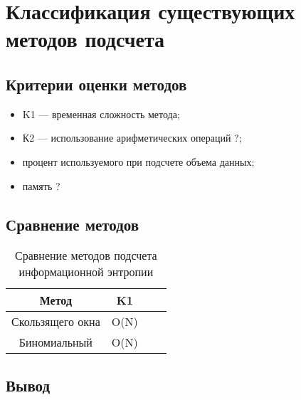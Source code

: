 \chapter{Классификация существующих методов подсчета}

\section{Критерии оценки методов}

\begin{itemize}
	\item K1 --- временная сложность метода;
	\item К2 --- использование арифметических операций ?;
	\item процент используемого при подсчете объема данных;
	\item память ?
\end{itemize}

\section{Сравнение методов}

\begin{table}[h]
    \caption{Сравнение методов подсчета информационной энтропии}
    \begin{center}
        \begin{tabular}{|c|c|c|c|}
        		\hline
            \textbf{Метод} & \textbf{K1} \\ \hline
            Скользящего окна &  O(N) \\ \hline
            Биномиальный &  O(N) \\  \hline
        \end{tabular}
    \end{center}
    \label{tab:comparison}
\end{table}

\section{Вывод}